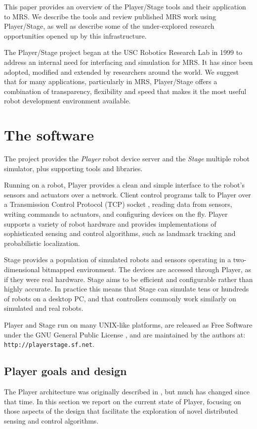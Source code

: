 \documentclass[a4paper]{ICAR2003}
\begin{document}
This paper provides an overview of the Player/Stage tools and their
application to MRS. We describe the tools and review published MRS
work using Player/Stage, as well as describe some of the under-explored
research opportunities opened up by this infrastructure.

The Player/Stage project began at the USC Robotics Research Lab in 1999
to address an internal need for interfacing and simulation for MRS.
It has since been adopted, modified and extended by researchers around
the world. We suggest that for many applications, particularly in MRS,
Player/Stage offers a combination of transparency, flexibility and speed
that makes it the most useful robot development environment available.

\section{The software}
The project provides the {\em Player} robot device server and the {\em
Stage} multiple robot simulator, plus supporting tools and libraries.

Running on a robot, Player provides a clean and simple interface to the
robot's sensors and actuators over a network. Client control programs talk
to Player over a Transmission Control Protocol (TCP) socket \cite{RFC793},
reading data from sensors, writing commands to actuators, and configuring
devices on the fly.  Player supports a variety of robot hardware and
provides implementations of sophisticated sensing and control algorithms,
such as landmark tracking and probabilistic localization.

Stage provides a population of simulated robots and sensors operating in
a two-dimensional bitmapped environment. The devices are accessed through
Player, as if they were real hardware. Stage aims to be efficient and
configurable rather than highly accurate. In practice this means that
Stage can simulate tens or hundreds of robots on a desktop PC, and that
controllers commonly work similarly on simulated and real robots.

Player and Stage run on many UNIX-like platforms, are released as
Free Software under the GNU General Public License \cite{GPL}, and are
maintained by the authors at: {\small \tt http://playerstage.sf.net}.

\subsection{Player goals and design}
\label{sect:player}
The Player architecture was originally described in
\cite{GerkeyVaughan01a}, but much has changed since that time.  In this
section we report on the current state of Player, focusing on those
aspects of the design that facilitate the exploration of novel distributed
sensing and control algorithms.
\end{document}
